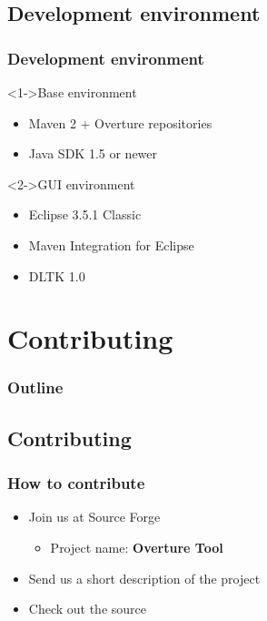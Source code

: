 \subsection{Development environment}
\frame
{
  \frametitle{Development environment}


\begin{block}<1->{Base environment}
  \begin{itemize}
  		\item Maven 2 + Overture repositories
  		\item Java SDK 1.5 or newer
  \end{itemize}
\end{block}

\begin{block}<2->{GUI environment}
  \begin{itemize}
  		\item Eclipse 3.5.1 Classic
		\item Maven Integration for Eclipse
  		\item DLTK 1.0
  \end{itemize}
\end{block}
}

\section{Contributing}
%
%
\begin{frame}
  \frametitle{Outline}
  \tableofcontents[current]
\end{frame}

\subsection{Contributing}

\frame
{
  \frametitle{How to contribute}

\begin{itemize}
\item Join us at Source Forge
	\begin{itemize}
	\item Project name: \textbf{Overture Tool}
	\end{itemize}
\item Send us a short description of the project
\item Check out the source
\end{itemize}

}

